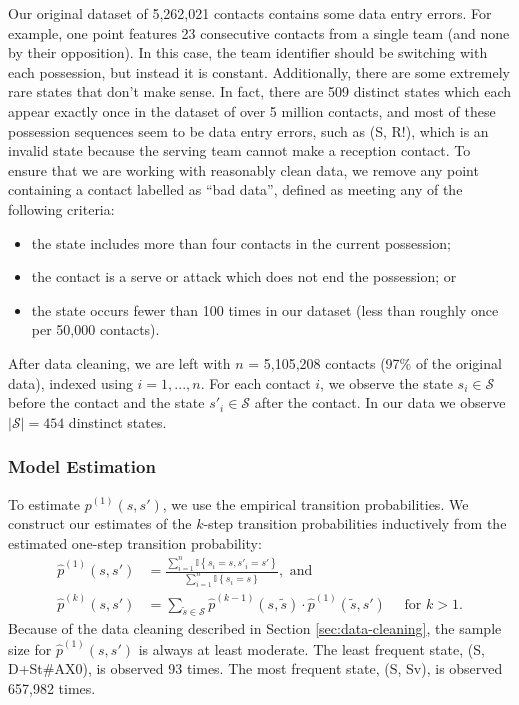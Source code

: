 \documentclass[USenglish]{article}
\theoremstyle{dgthm}
\theoremstyle{dgdef}
\begin{document}
Our original dataset of 5,262,021 contacts contains some data entry errors. For example, one point features 23 consecutive contacts from a single team (and none by their opposition). In this case, the team identifier should be switching with each possession, but instead it is constant. Additionally, there are some extremely rare states that don't make sense. In fact, there are 509 distinct states which each appear exactly once in the dataset of over 5 million contacts, and most of these possession sequences seem to be data entry errors, such as (S, R!), which is an invalid state because the serving team cannot make a reception contact. To ensure that we are working with reasonably clean data, we remove any point containing a contact labelled as ``bad data'', defined as meeting any of the following criteria:
\begin{itemize}
  \item the state includes more than four contacts in the current possession;
  \item the contact is a serve or attack which does not end the possession; or
  \item the state occurs fewer than 100 times in our dataset (less than roughly once per 50,000 contacts).
\end{itemize}

After data cleaning, we are left with $n$ = 5,105,208 contacts (97\% of the original data), indexed using $i = 1, ..., n$. For each contact $i$, we observe the state $s_i \in \mathcal{S}$ before the contact and the state $s'_i \in \mathcal{S}$ after the contact. In our data we observe $|\mathcal{S}| = 454$ dinstinct states.

\subsubsection{Model Estimation}

To estimate $p^{(1)}(s, s')$, we use the empirical transition probabilities. We construct our estimates of the $k$-step transition probabilities inductively from the estimated one-step transition probability:
\begin{align}
  \label{eqn:transition-prob}
  \hat p^{(1)}(s, s') &= \frac
    {\sum_{i = 1}^n \mathbb{I}\left\{s_i = s, s'_i = s'\right\}}
    {\sum_{i = 1}^n \mathbb{I}\left\{s_i = s\right\}},\mbox{ and}\\
  \hat p^{(k)}(s, s') &= \sum_{\tilde s \in \mathcal{S}} \hat p^{(k-1)}(s, \tilde s) \cdot \hat p^{(1)}(\tilde s, s') \quad \mbox{ for }k > 1.
\end{align}
Because of the data cleaning described in Section \ref{sec:data-cleaning}, the sample size for $\hat p^{(1)}(s, s')$ is always at least moderate. The least frequent state, (S, D+St\#AX0), is observed 93 times. The most frequent state, (S, Sv), is observed 657,982 times.
\end{document}
